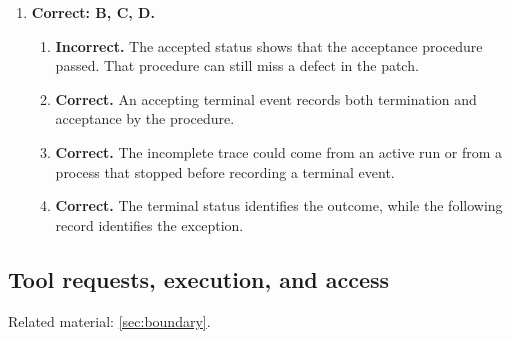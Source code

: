 \begin{enumerate}[start=21,itemsep=0.7\baselineskip]
\item[{\hyperref[exercise:30]{30.}}] \begin{minipage}[t]{\linewidth}
\textbf{Correct: B, C, D.}
\begin{enumerate}[label=\textnormal{(\Alph*)},leftmargin=*,itemsep=0pt]
\item \textbf{Incorrect.} The accepted status shows that the acceptance procedure passed. That procedure can still miss a defect in the patch.
\item \textbf{Correct.} An accepting terminal event records both termination and acceptance by the procedure.
\item \textbf{Correct.} The incomplete trace could come from an active run or from a process that stopped before recording a terminal event.
\item \textbf{Correct.} The terminal status identifies the outcome, while the following record identifies the exception.
\end{enumerate}
\end{minipage}

\end{enumerate}

\subsection{Tool requests, execution, and access}
\noindent Related material: \cref{sec:boundary}.

